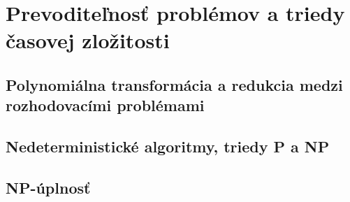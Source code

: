 \documentclass[../main.tex]{subfiles}
\begin{document}
\section{Prevoditeľnosť problémov a triedy časovej zložitosti}
\subsection{Polynomiálna transformácia a redukcia medzi rozhodovacími problémami}
\subsection{Nedeterministické algoritmy, triedy P a NP}
\subsection{NP-úplnosť}
\end{document}
